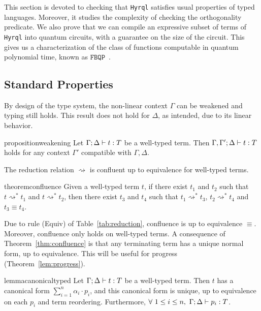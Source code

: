 \documentclass[10pt,a4paper]{article}
\newcommand{\typing}[4]{
  \ifx&#1&\varnothing \else #1\fi; 
  \ifx&#2&\varnothing \else #2\fi 
  \vdash {#3} : #4
}
\newcommand{\reduces}{\rightsquigarrow}
\newcommand{\sreduces}{\reduces^*}
\newcommand{\hyrql}{{{\tt{Hyrql}}}}
\newcommand{\fbqp}{\ensuremath{\mathtt{FBQP}}}
\begin{document}
This section is devoted to checking that {\hyrql} satisfies usual properties of
typed languages. Moreover, it studies the complexity of checking the
orthogonality predicate. We also prove that we can compile an expressive subset
of terms of \hyrql{} into quantum circuits, with a guarantee on the size of the
circuit. This gives us a characterization of the class of functions computable
in quantum polynomial time, known as \fbqp{}~\cite{BV97}.

\subsection{Standard Properties}
\label{subsec:properties}


By design of the type system, the non-linear context $\Gamma$ can be weakened
and typing still holds. This result does not hold for $\Delta$, as intended,
due to its linear behavior.

\begin{restatable}[Weakening]{proposition}{weakening}
  \label{lem:weakening}
  Let $\typing \Gamma \Delta t T$ be a well-typed term.
  Then $\typing {\Gamma, \Gamma'} \Delta t T$ holds for any context
  $\Gamma'$ compatible with $\Gamma, \Delta$.
\end{restatable}

The reduction relation $\reduces$ is confluent up to equivalence for
well-typed terms.

\begin{restatable}[Confluence]{theorem}{confluence}
  \label{thm:confluence}
  Given a well-typed term $t$, if there exist $t_1$ and $t_2$ such
  that $t \sreduces t_1$ and $t\sreduces t_2$,
  then there exist $t_3$ and $t_4$
  such that $t_1 \sreduces t_3$, $t_2 \sreduces t_4$ and $t_3 \equiv t_4$.
\end{restatable}
Due to rule (Equiv) of Table~\ref{tab:reduction}, confluence is up to
equivalence $\equiv$. Moreover, confluence only holds on well-typed terms.
A consequence of Theorem~\ref{thm:confluence} is that any terminating term has
a unique normal form, up to equivalence. This will be useful for progress
(Theorem~\ref{lem:progress}).

\begin{restatable}{lemma}{canonicaltyped}
  \label{lem:canonical-typed}
  Let $\typing \Gamma \Delta t T$ be a well-typed term.
  Then $t$ has a canonical form $\sum_{i=1}^n \alpha_i \cdot p_i$,
  and this canonical form is unique, up to equivalence on each $p_i$
  and term reordering. Furthermore, $\forall\ 1 \leq i \leq n,\ \typing \Gamma
  \Delta {p_i} T$.
\end{restatable}
\end{document}

